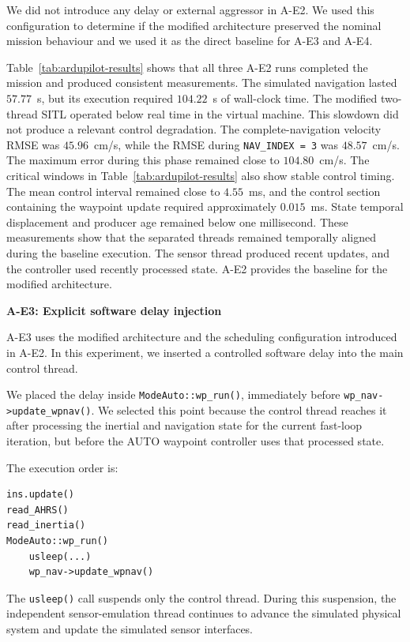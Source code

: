 \noindent We did not introduce any delay or external aggressor in A-E2. We used this configuration to determine if the modified architecture preserved the nominal mission behaviour and we used it as the direct baseline for A-E3 and A-E4.

\noindent Table~\ref{tab:ardupilot-results} shows that all three A-E2 runs completed the mission and produced consistent measurements. The simulated navigation lasted \(57.77\)~s, but its execution required \(104.22\)~s of wall-clock time. The modified two-thread SITL operated below real time in the virtual machine. This slowdown did not produce a relevant control degradation. The complete-navigation velocity RMSE was \(45.96\)~cm/s, while the RMSE during \texttt{NAV\_INDEX = 3} was \(48.57\)~cm/s. The maximum error during this phase remained close to \(104.80\)~cm/s.
The critical windows in Table~\ref{tab:ardupilot-results} also show
stable control timing. The mean control interval remained close to
\(4.55\)~ms, and the control section containing the waypoint update
required approximately \(0.015\)~ms. State temporal displacement and producer age remained below one millisecond.  These measurements show that the separated threads remained
temporally aligned during the baseline execution. The sensor thread
produced recent updates, and the controller used recently processed
state. A-E2 provides the baseline for the modified architecture.

\noindent \textbf{A-E3: Explicit software delay injection}

\noindent A-E3 uses the modified architecture and the scheduling configuration introduced in A-E2. In this experiment, we inserted a controlled software delay into the main control thread.

\noindent We placed the delay inside \texttt{ModeAuto::wp\_run()}, immediately before \texttt{wp\_nav->update\_wpnav()}. We selected this point because the control thread reaches it after processing the inertial and navigation state for the current fast-loop iteration, but before the AUTO waypoint controller uses that processed state.

\noindent  The execution order is:
\begin{verbatim}
ins.update()
read_AHRS()
read_inertia()
ModeAuto::wp_run()
    usleep(...)
    wp_nav->update_wpnav()
\end{verbatim}
\noindent The \texttt{usleep()} call suspends only the control thread. During this suspension, the independent sensor-emulation thread continues to advance the simulated physical system and update the simulated sensor interfaces.

